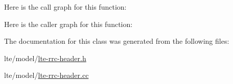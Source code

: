 Here is the call graph for this function\+:




Here is the caller graph for this function\+:




The documentation for this class was generated from the following files\+:\begin{DoxyCompactItemize}
\item 
lte/model/\hyperlink{lte-rrc-header_8h}{lte-\/rrc-\/header.\+h}\item 
lte/model/\hyperlink{lte-rrc-header_8cc}{lte-\/rrc-\/header.\+cc}\end{DoxyCompactItemize}
